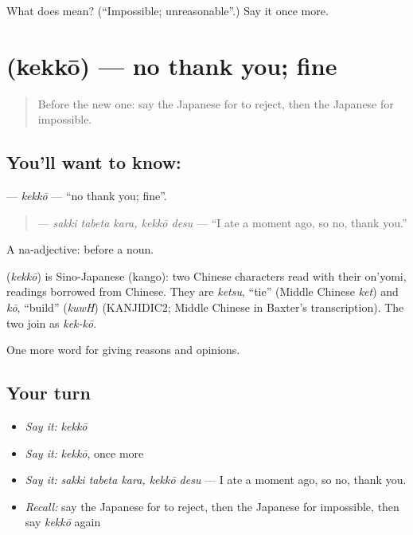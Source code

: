\begin{tcolorbox}[breakable,colback=teal!4,colframe=teal!35!black,title={Before you move on}]
What does  mean? (\textquotedblleft{}Impossible; unreasonable\textquotedblright{}.) Say it once more.
\end{tcolorbox}
\section[\texorpdfstring{\ja{けっこう} (kekkō)}{けっこう (kekkō)}]{ (kekkō) — no thank you; fine}

\label{lesson:JA-C323-kekkou}



\begin{quote}
Before the new one: say the Japanese for to reject, then the Japanese for impossible.
\end{quote}

\subsection*{You'll want to know: }
\textbf{} — \emph{kekkō} — \textquotedblleft{}no thank you; fine\textquotedblright{}.

\begin{quote}
\textbf{ } — \emph{sakki tabeta kara, kekkō desu} — \textquotedblleft{}I ate a moment ago, so no, thank you.\textquotedblright{}
\end{quote}

A na-adjective:  before a noun.

\begin{cousinweb}
\textbf{} (\emph{kekkō}) is Sino-Japanese (kango): two Chinese characters read with their on'yomi, readings borrowed from Chinese. They are \emph{ketsu}, \textquotedblleft{}tie\textquotedblright{} (Middle Chinese \emph{ket}) and \emph{kō}, \textquotedblleft{}build\textquotedblright{} (\emph{kuwH}) (KANJIDIC2; Middle Chinese in Baxter's transcription). The two join as \emph{kek-kō}.
\end{cousinweb}

\begin{grammarlens}[title={What you've built}]
One more word for giving reasons and opinions.
\end{grammarlens}

\subsection*{Your turn}
\begin{itemize}
\raggedright
  \item \emph{Say it:} \emph{kekkō}
  \item \emph{Say it:} \emph{kekkō}, once more
  \item \emph{Say it:} \emph{sakki tabeta kara, kekkō desu} — I ate a moment ago, so no, thank you.
  \item \emph{Recall:} say the Japanese for to reject, then the Japanese for impossible, then say \emph{kekkō} again
\end{itemize}

